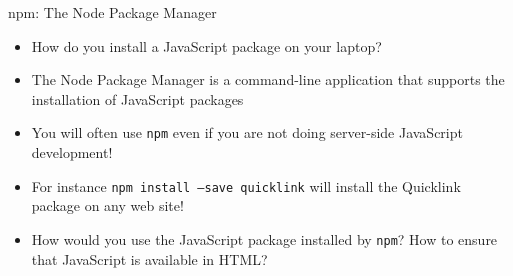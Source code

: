 \documentclass[14pt,aspectratio=169]{beamer}
\begin{document}
%
\begin{frame}{npm: The Node Package Manager}
  \begin{itemize}
    \item How do you install a JavaScript package on your laptop?
      \vspace*{-.15in}
    \item The Node Package Manager is a command-line application that supports
      the installation of JavaScript packages
      \vspace*{-.15in}
    \item You will often use {\tt npm} even if you are not doing server-side
      JavaScript development!
      \vspace*{-.15in}
    \item For instance {\tt npm install --save quicklink} will install the
      Quicklink package on any web site!
      \vspace*{-.15in}
    \item How would you use the JavaScript package installed by {\tt npm}? How
      to ensure that JavaScript is available in HTML?
  \end{itemize}
\end{frame}
\end{document}
